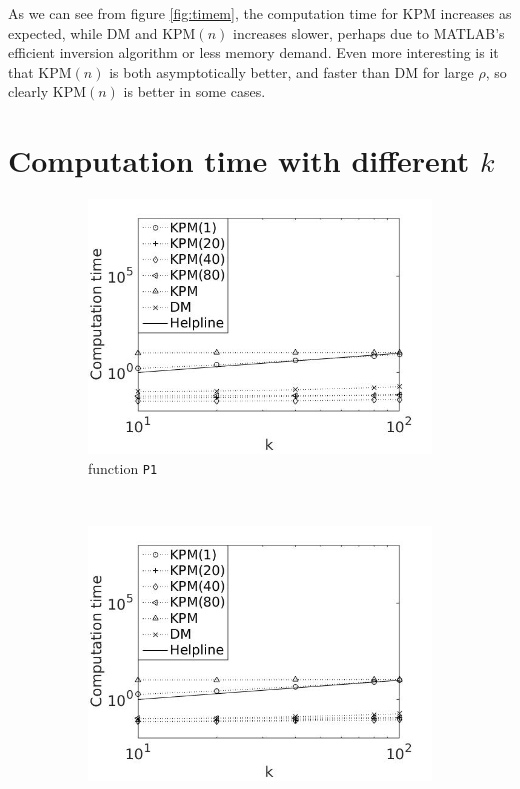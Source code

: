 As we can see from figure \ref{fig:timem}, the computation time for KPM increases as expected, while DM and KPM$(n)$ increases slower, perhaps due to MATLAB's efficient inversion algorithm or less memory demand. 
Even more interesting is it that KPM$(n)$ is both asymptotically better, and faster than DM for large $\rho$, so clearly KPM$(n)$ is better in some cases.
\section{Computation time with different $k$} \label{sec:stimek}
\begin{figure}[H]
        \centering
        \begin{subfigure}[b]{0.45\textwidth}
                \includegraphics[width=\textwidth]{fig/n7timevsk1}
                \caption{function \texttt{P1}}
                \label{fig:timek1}
        \end{subfigure}%
~
        \begin{subfigure}[b]{0.45\textwidth}
                \includegraphics[width=\textwidth]{fig/n8timevsk2}

\end{subfigure}
\end{figure}
